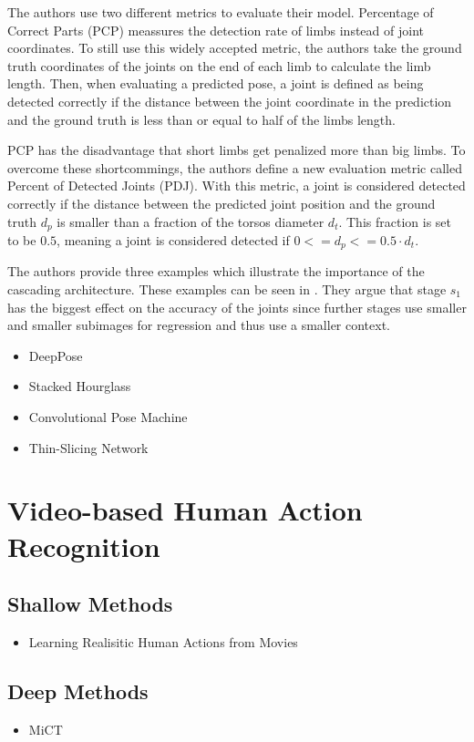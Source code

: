 The authors use two different metrics to evaluate their model.
Percentage of Correct Parts (PCP) \cite{eichner_articulated_2010} meassures the detection rate of limbs instead of joint coordinates.
To still use this widely accepted metric, the authors take the ground truth coordinates of the joints on the end of each limb to calculate the limb length.
Then, when evaluating a predicted pose, a joint is defined as being detected correctly if the distance between the joint coordinate in the prediction and the ground truth is less than or equal to half of the limbs length.

PCP has the disadvantage that short limbs get penalized more than big limbs.
To overcome these shortcommings, the authors define a new evaluation metric called Percent of Detected Joints (PDJ).
With this metric, a joint is considered detected correctly if the distance between the predicted joint position and the ground truth $d_p$ is smaller than a fraction of the torsos diameter $d_t$.
This fraction is set to be $0.5$, meaning a joint is considered detected if $0 <= d_p <= 0.5 \cdot d_t$.

The authors provide three examples which illustrate the importance of the cascading architecture.
These examples can be seen in .
They argue that stage $s_1$ has the biggest effect on the accuracy of the joints since further stages use smaller and smaller subimages for regression and thus use a smaller context.

\begin{itemize}
    \item DeepPose \cite{toshev_deeppose:_2014}
    \item Stacked Hourglass \cite{newell_stacked_2016}
    \item Convolutional Pose Machine \cite{wei_convolutional_2016}
    \item Thin-Slicing Network \cite{song_thin-slicing_2017}
\end{itemize}

\section{Video-based Human Action Recognition}
\subsection{Shallow Methods}
\begin{itemize}
    \item Learning Realisitic Human Actions from Movies \cite{laptev_learning_2008}
\end{itemize}

\subsection{Deep Methods}
\begin{itemize}
    \item MiCT \cite{zhou_mict:_2018}
\end{itemize}